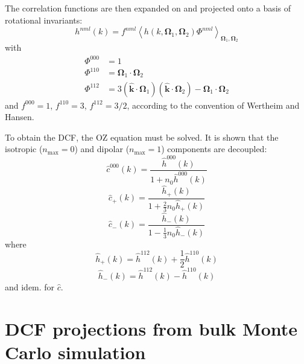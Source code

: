 The correlation functions are then expanded on and projected onto a basis
of rotational invariants:
\begin{equation}
h^{nml}(k)=f^{nml}\left\langle h(k,\mathbf{\Omega}_{1},\mathbf{\Omega}_{2})\Phi^{nml}\right\rangle _{\mathbf{\Omega}_{1},\mathbf{\Omega}_{2}}
\end{equation}
with
\begin{align}
\Phi^{000} & =1\nonumber \\
\Phi^{110} & =\mathbf{\Omega}_{1}\cdot\mathbf{\Omega}_{2}\\
\Phi^{112} & =3(\hat{\mathbf{k}}\cdot\mathbf{\Omega}_{1})(\hat{\mathbf{k}}\cdot\mathbf{\Omega}_{2})-\mathbf{\Omega}_{1}\cdot\mathbf{\Omega}_{2}\nonumber 
\end{align}
and $f^{000}=1$, $f^{110}=3$, $f^{112}=3/2$, according to the convention
of Wertheim and Hansen.

To obtain the \acs{DCF}, the \acs{OZ} equation must be solved. It
is shown that the isotropic ($n_{\max}=0$) and dipolar ($n_{\max}=1$)
components are decoupled:
\begin{equation}
\hat{c}^{000}(k)=\frac{\hat{h}^{000}(k)}{1+n_{0}\hat{h}^{000}(k)}
\end{equation}
\begin{equation}
\hat{c}_{+}(k)=\frac{\hat{h}_{+}(k)}{1+\frac{2}{3}n_{0}\hat{h}_{+}(k)}
\end{equation}
\begin{equation}
\hat{c}_{-}(k)=\frac{\hat{h}_{-}(k)}{1-\frac{1}{3}n_{0}\hat{h}_{-}(k)}
\end{equation}
where
\begin{equation}
\hat{h}_{+}(k)=\hat{h}^{112}(k)+\frac{1}{2}\hat{h}^{110}(k)
\end{equation}
\begin{equation}
\hat{h}_{-}(k)=\hat{h}^{112}(k)-\hat{h}^{110}(k)
\end{equation}
and idem. for $\hat{c}$.

\section{DCF projections from bulk Monte Carlo simulation}

